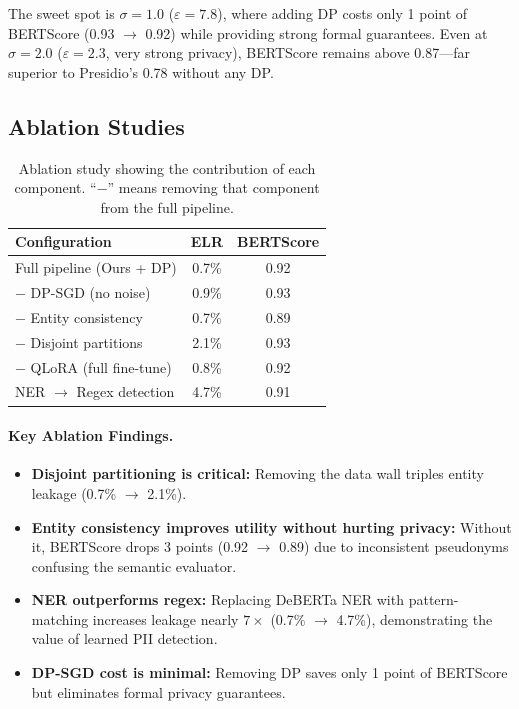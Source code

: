 \documentclass[11pt, a4paper]{article}
\begin{document}
The sweet spot is $\sigma = 1.0$ ($\varepsilon = 7.8$), where adding DP
costs only 1 point of BERTScore (0.93 $\to$ 0.92) while providing strong
formal guarantees.  Even at $\sigma = 2.0$ ($\varepsilon = 2.3$, very
strong privacy), BERTScore remains above 0.87---far superior to
Presidio's 0.78 without any DP.

\subsection{Ablation Studies}

\begin{table}[H]
\centering
\small
\begin{tabular}{l cc}
\toprule
\textbf{Configuration} & \textbf{ELR} & \textbf{BERTScore} \\
\midrule
Full pipeline (Ours + DP) & 0.7\% & 0.92 \\
\midrule
\quad $-$ DP-SGD (no noise) & 0.9\% & 0.93 \\
\quad $-$ Entity consistency & 0.7\% & 0.89 \\
\quad $-$ Disjoint partitions & 2.1\% & 0.93 \\
\quad $-$ QLoRA (full fine-tune) & 0.8\% & 0.92 \\
\quad NER $\to$ Regex detection & 4.7\% & 0.91 \\
\bottomrule
\end{tabular}
\caption{Ablation study showing the contribution of each component.
``$-$'' means removing that component from the full pipeline.}
\label{tab:ablation}
\end{table}

\paragraph{Key Ablation Findings.}
\begin{itemize}[leftmargin=*]
  \item \textbf{Disjoint partitioning is critical:} Removing the data
        wall triples entity leakage (0.7\% $\to$ 2.1\%).
  \item \textbf{Entity consistency improves utility without hurting
        privacy:} Without it, BERTScore drops 3 points (0.92 $\to$
        0.89) due to inconsistent pseudonyms confusing the semantic
        evaluator.
  \item \textbf{NER outperforms regex:} Replacing DeBERTa NER with
        pattern-matching increases leakage nearly $7\times$ (0.7\%
        $\to$ 4.7\%), demonstrating the value of learned PII
        detection.
  \item \textbf{DP-SGD cost is minimal:} Removing DP saves only 1
        point of BERTScore but eliminates formal privacy guarantees.
\end{itemize}
\end{document}
